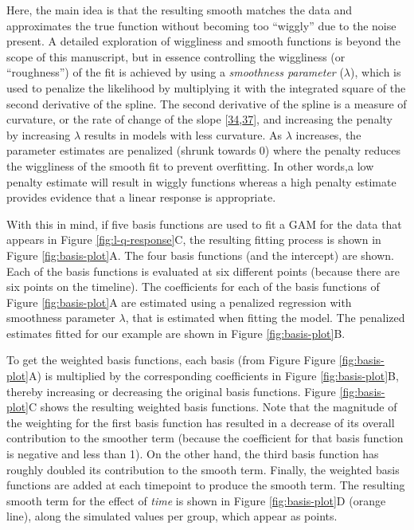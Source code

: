 \documentclass[
]{article}
\begin{document}
Here, the main idea is that the resulting smooth matches the data and approximates the true function without becoming too ``wiggly'' due to the noise present. A detailed exploration of wiggliness and smooth functions is beyond the scope of this manuscript, but in essence controlling the wiggliness (or ``roughness'') of the fit is achieved by using a \emph{smoothness parameter} (\(\lambda\)), which is used to penalize the likelihood by multiplying it with the integrated square of the second derivative of the spline. The second derivative of the spline is a measure of curvature, or the rate of change of the slope {[}\protect\hyperlink{ref-simpson2018}{34},\protect\hyperlink{ref-wood2017}{37}{]}, and increasing the penalty by increasing \(\lambda\) results in models with less curvature. As \(\lambda\) increases, the parameter estimates are penalized (shrunk towards 0) where the penalty reduces the wiggliness of the smooth fit to prevent overfitting. In other words,a low penalty estimate will result in wiggly functions whereas a high penalty estimate provides evidence that a linear response is appropriate.

With this in mind, if five basis functions are used to fit a GAM for the data that appears in Figure \ref{fig:l-q-response}C, the resulting fitting process is shown in Figure \ref{fig:basis-plot}A. The four basis functions (and the intercept) are shown. Each of the basis functions is evaluated at six different points (because there are six points on the timeline). The coefficients for each of the basis functions of Figure \ref{fig:basis-plot}A are estimated using a penalized regression with smoothness parameter \(\lambda\), that is estimated when fitting the model. The penalized estimates fitted for our example are shown in Figure \ref{fig:basis-plot}B.

To get the weighted basis functions, each basis (from Figure Figure \ref{fig:basis-plot}A) is multiplied by the corresponding coefficients in Figure \ref{fig:basis-plot}B, thereby increasing or decreasing the original basis functions. Figure \ref{fig:basis-plot}C shows the resulting weighted basis functions. Note that the magnitude of the weighting for the first basis function has resulted in a decrease of its overall contribution to the smoother term (because the coefficient for that basis function is negative and less than 1). On the other hand, the third basis function has roughly doubled its contribution to the smooth term. Finally, the weighted basis functions are added at each timepoint to produce the smooth term. The resulting smooth term for the effect of \emph{time} is shown in Figure \ref{fig:basis-plot}D (orange line), along the simulated values per group, which appear as points.
\end{document}
